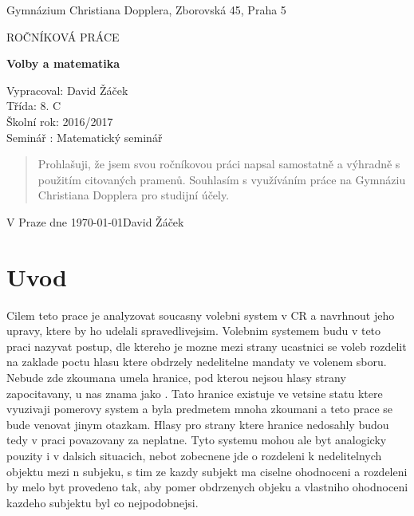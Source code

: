 \documentclass[12pt,a4paper]{article}
\begin{document}
\begin{titlepage}
	\begin{center}
	{\large Gymnázium Christiana Dopplera, Zborovská 45, Praha 5 \par}
	\vfill
	\par\vspace{1cm}
	{\scshape\LARGE ROČNÍKOVÁ PRÁCE \par}
	{\huge\bfseries Volby a matematika\par}
	\vfill
\end{center}
Vypracoval: David Žáček \\
Třída: 8. C \\
Školní rok: 2016/2017 \\
Seminář : Matematický seminář \\
	\vfill
\end{titlepage}

\vspace*{\fill}
\begin{quote}
Prohlašuji, že jsem svou ročníkovou práci napsal samostatně a výhradně s
použitím 
citovaných pramenů. Souhlasím s
využíváním 
práce na Gymnáziu Christiana Dopplera 
pro studijní účely. \\
\end{quote}

V Praze dne \today \hfill David Žáček

\vspace*{\fill}
\thispagestyle{empty}
\newpage
\tableofcontents
\newpage
\section{Uvod}
Cilem teto prace je analyzovat soucasny volebni system v CR a navrhnout jeho upravy, ktere by ho udelali spravedlivejsim. 
Volebnim systemem budu v teto praci nazyvat postup, dle ktereho je mozne mezi strany ucastnici se voleb rozdelit na zaklade poctu hlasu ktere obdrzely nedelitelne mandaty ve volenem sboru. 
Nebude zde zkoumana umela hranice, pod kterou nejsou hlasy strany zapocitavany, u nas znama jako .
Tato hranice existuje ve vetsine statu ktere vyuzivaji pomerovy system a byla predmetem mnoha zkoumani a teto prace se bude venovat jinym otazkam.
Hlasy pro strany ktere hranice nedosahly budou tedy v praci povazovany za neplatne.
Tyto systemu mohou ale byt analogicky pouzity i v dalsich situacich, nebot zobecnene jde o rozdeleni k nedelitelnych objektu mezi n subjeku, s tim ze kazdy subjekt ma ciselne ohodnoceni a rozdeleni by melo byt provedeno tak, aby pomer obdrzenych objeku a vlastniho ohodnoceni kazdeho subjektu byl co nejpodobnejsi. 
\end{document}
